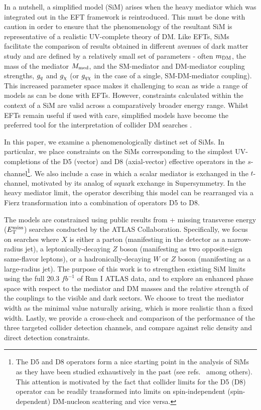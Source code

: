 In a nutshell, a simplified model (SiM) arises when the heavy mediator which was integrated out in the EFT framework is reintroduced. This must be done with caution in order to ensure that the phenomenology of the resultant SiM is representative of a realistic UV-complete theory of DM.
%
Like EFTs, SiMs facilitate the comparison of results obtained in  different avenues of dark matter study \cite{DiFranzo:2013vra, Buckley:2014fba} and are defined by a relatively small set of parameters - often $m_{\mathrm{DM}}$, the mass of the mediator $M_{\mathrm{med}}$, and the SM-mediator and DM-mediator coupling strengths, $g_q$ and $g_{\chi}$ (or $g_{q \chi}$ in the case of a single, SM-DM-mediator coupling). This increased parameter space makes it challenging to scan as wide a range of models as can be done with EFTs. However, constraints calculated within the context of a SiM are valid across a comparatively broader energy range.
%
Whilst EFTs remain useful if used with care, simplified models have become the preferred tool for the interpretation of collider DM searches \cite{DM_MET_LHC, DMOxfordReport, DMForumReport, Harris:2014hga,Buchmueller:2014yoa}.


In this paper, we examine a phenomenologically distinct set of SiMs. In particular, we place constraints on the SiMs corresponding to the simplest UV-completions of the D5 (vector) and D8 (axial-vector) effective operators in the $s$-channel\footnote{The D5 and D8 operators form a nice starting point in the analysis of SiMs as they have been studied exhaustively in the past (see refs.~\cite{Aad:1363019, ATLAS-CONF-2012-147, CMS-PAS-EXO-12-048, Buckley:2013jwa, Abdallah:1472683, MonoX, ValidEFT, ValidEFT_part2, ValidEFT_part3} among others). This attention is motivated by the fact that collider limits for the D5 (D8) operator can be readily transformed into limits on spin-independent (spin-dependent) DM-nucleon scattering and vice versa.}. We also include a case in which a scalar mediator is exchanged in the $t$-channel, motivated by its analog of squark exchange in Supersymmetry. In the heavy mediator limit, the operator describing this model can be rearranged via a Fierz transformation into a combination of operators D5 to D8.

The models are constrained using public results from \monoX + missing transverse energy ($E_{\mathrm{T}}^{\mathrm{miss}}$) searches conducted by the ATLAS Collaboration. Specifically, we focus on searches where $X$ is either a parton (manifesting in the detector as a narrow-radius jet), a leptonically-decaying $Z$ boson (manifesting as two opposite-sign same-flavor leptons), or a hadronically-decaying $W$ or $Z$ boson (manifesting as a large-radius jet). The purpose of this work is to strengthen existing SiM limits using the full 20.3 $fb^{-1}$ of Run I ATLAS data, and to explore an enhanced phase space with respect to the mediator and DM masses and the relative strength of the couplings to the visible and dark sectors. We choose to treat the mediator width as the minimal value naturally arising, which is more realistic than a fixed width. Lastly, we provide a cross-check and comparison of the performance of the three targeted collider detection channels, and compare against relic density and direct detection constraints.


